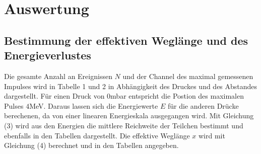\section{Auswertung}
\label{sec:Auswertung}
\subsection{Bestimmung der effektiven Weglänge und des Energieverlustes}
Die gesamte Anzahl an Ereignissen $N$ und der Channel des maximal gemessenen Impulses wird in Tabelle 1 und 2 in Abhängigkeit des Druckes und
des Abstandes dargestellt. Für einen Druck von $0$mbar entspricht die Postion des maximalen Pulses $4$MeV. Daraus lassen sich die Energiewerte $E$ für die
anderen Drücke berechenen, da von einer linearen Energieskala ausgegangen wird. Mit Gleichung (3) wird aus den Energien die mittlere Reichweite
der Teilchen bestimmt und ebenfalls in den Tabellen dargestellt. Die effektive Weglänge $x$ wird mit Gleichung (4) berechnet und in den Tabellen angegeben.


